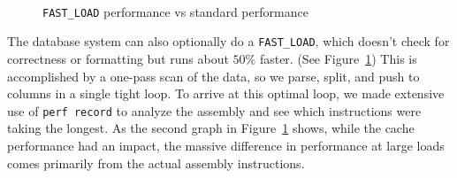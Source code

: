\documentclass[a4paper, 12pt]{article}
\begin{document}
 \begin{figure}[ht]
     \centering
        ~
        \caption{\texttt{FAST\_LOAD} performance vs standard performance}
        \label{fig:loads}
 \end{figure}

\medskip
The database system can also optionally do a \texttt{FAST\_LOAD}, which doesn't check for correctness or formatting but runs about $50\%$ faster. (See Figure~\ref{fig:loads}) This is accomplished by a one-pass scan of the data, so we parse, split, and push to columns in a single tight loop. To arrive at this optimal loop, we made extensive use of \texttt{perf record} to analyze the assembly and see which instructions were taking the longest. As the second graph in Figure~\ref{fig:loads} shows, while the cache performance had an impact, the massive difference in performance at large loads comes primarily from the actual assembly instructions.
\end{document}
